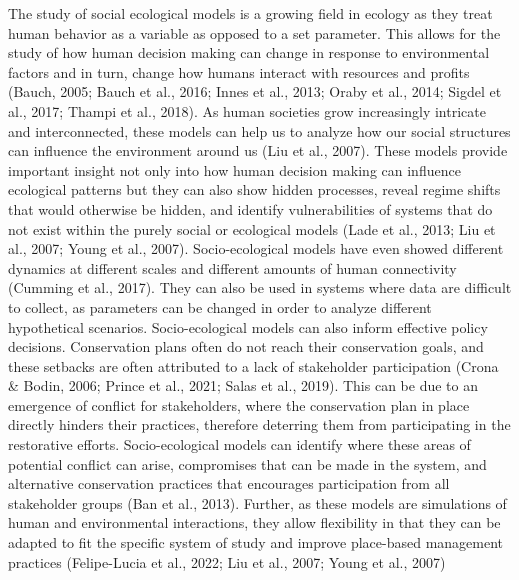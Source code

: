\documentclass[
]{article}
\begin{document}
The study of social ecological models is a growing field in ecology as they treat human behavior as a variable as opposed to a set parameter. This allows for the study of how human decision making can change in response to environmental factors and in turn, change how humans interact with resources and profits (Bauch, 2005; Bauch et al., 2016; Innes et al., 2013; Oraby et al., 2014; Sigdel et al., 2017; Thampi et al., 2018). As human societies grow increasingly intricate and interconnected, these models can help us to analyze how our social structures can influence the environment around us (Liu et al., 2007). These models provide important insight not only into how human decision making can influence ecological patterns but they can also show hidden processes, reveal regime shifts that would otherwise be hidden, and identify vulnerabilities of systems that do not exist within the purely social or ecological models (Lade et al., 2013; Liu et al., 2007; Young et al., 2007). Socio-ecological models have even showed different dynamics at different scales and different amounts of human connectivity (Cumming et al., 2017). They can also be used in systems where data are difficult to collect, as parameters can be changed in order to analyze different hypothetical scenarios. Socio-ecological models can also inform effective policy decisions. Conservation plans often do not reach their conservation goals, and these setbacks are often attributed to a lack of stakeholder participation (Crona \& Bodin, 2006; Prince et al., 2021; Salas et al., 2019). This can be due to an emergence of conflict for stakeholders, where the conservation plan in place directly hinders their practices, therefore deterring them from participating in the restorative efforts. Socio-ecological models can identify where these areas of potential conflict can arise, compromises that can be made in the system, and alternative conservation practices that encourages participation from all stakeholder groups (Ban et al., 2013). Further, as these models are simulations of human and environmental interactions, they allow flexibility in that they can be adapted to fit the specific system of study and improve place-based management practices (Felipe-Lucia et al., 2022; Liu et al., 2007; Young et al., 2007)
\end{document}
